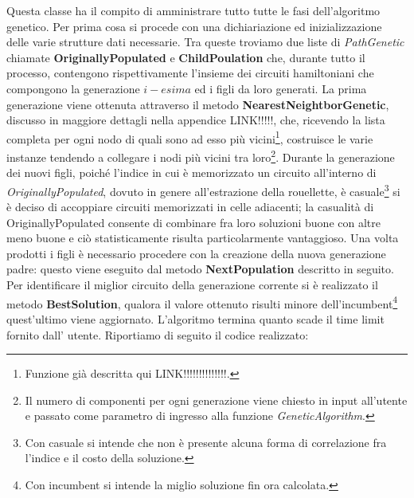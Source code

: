\documentclass[11pt]{article}
\begin{document}
Questa classe ha il compito di amministrare tutto tutte le fasi dell'algoritmo genetico. Per prima cosa si procede con una dichiariazione ed inizializzazione delle varie strutture dati necessarie. Tra queste troviamo due liste di \textit{PathGenetic} chiamate \textbf{OriginallyPopulated} e \textbf{ChildPoulation} che, durante tutto il processo, contengono rispettivamente l'insieme dei circuiti hamiltoniani che compongono la generazione $i-esima$ ed i figli da loro generati. La prima generazione viene ottenuta attraverso il metodo \textbf{NearestNeightborGenetic}, discusso in maggiore dettagli nella appendice LINK!!!!!, che, ricevendo la lista completa per ogni nodo di quali sono ad esso più vicini\footnote{Funzione già descritta qui LINK!!!!!!!!!!!!!!.}, costruisce le varie instanze tendendo a collegare i nodi più vicini tra loro\footnote{Il numero di componenti per ogni generazione viene chiesto in input all'utente e passato come parametro di ingresso alla funzione \textit{GeneticAlgorithm}.}.
Durante la generazione dei nuovi figli, poiché l'indice in cui è memorizzato un circuito all'interno di \textit{OriginallyPopulated}, dovuto in genere all'estrazione della rouellette, è casuale\footnote{Con casuale si intende che non è presente alcuna forma di correlazione fra l'indice e il costo della soluzione.} si è deciso di accoppiare circuiti memorizzati in celle adiacenti; la casualità di OriginallyPopulated consente di combinare fra loro soluzioni buone con altre meno buone e ciò statisticamente risulta particolarmente vantaggioso.
Una volta prodotti i figli è necessario procedere con la creazione della nuova generazione padre: questo viene eseguito dal metodo \textbf{NextPopulation} descritto in seguito. Per identificare il miglior circuito della generazione corrente si è realizzato il metodo \textbf{BestSolution}, qualora il valore ottenuto risulti minore dell’incumbent\footnote{Con incumbent si intende la miglio soluzione fin ora calcolata.} quest'ultimo viene aggiornato. L'algoritmo termina quanto scade il time limit fornito dall' utente.  Riportiamo di seguito il codice realizzato:
\end{document}

